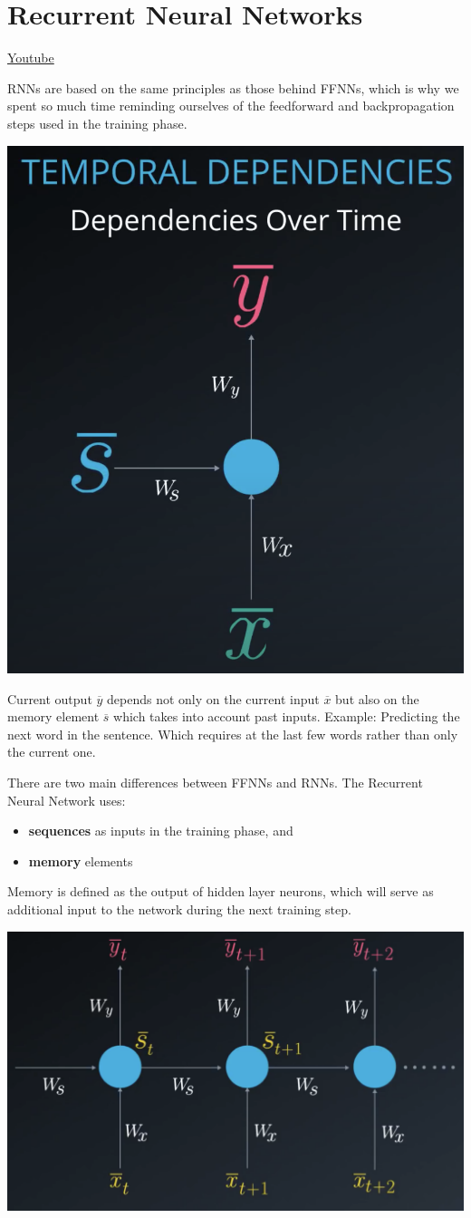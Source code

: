\section{Recurrent Neural Networks}
\href{https://www.youtube.com/watch?v=ofbnDxGSUcg&ab_channel=Udacity}{Youtube} \newline

RNNs are based on the same principles as those behind FFNNs, which is why we spent so much time reminding ourselves of the feedforward and backpropagation steps used in the training phase.

    \includegraphics[width=0.5\linewidth]{img//rnn//intro/image1.png}

Current output \(\overline{y}\) depends not only on the current input \(\overline{x}\) but also on the memory element \(\overline{s}\) which takes into account past inputs. Example: Predicting the next word in the sentence. Which requires at the last few words rather than only the current one.

There are two main differences between FFNNs and RNNs. The Recurrent Neural Network uses:

\begin{itemize}
    \item \textbf{sequences} as inputs in the training phase, and
    \item \textbf{memory} elements
\end{itemize}
Memory is defined as the output of hidden layer neurons, which will serve as additional input to the network during the next training step.

    \includegraphics[width=1\linewidth]{img//rnn//intro/image2.png}

